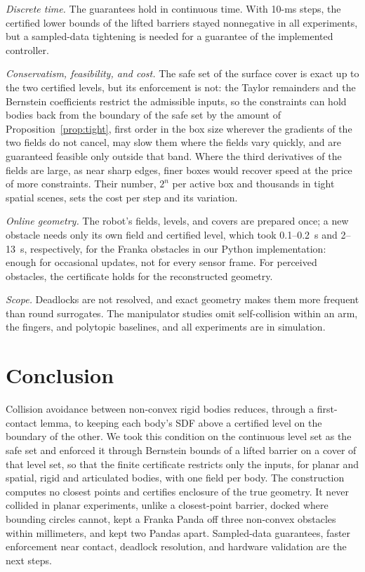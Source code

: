 \documentclass[journal]{IEEEtran}
\theoremstyle{definition}
\begin{document}
\emph{Discrete time.} The guarantees hold in continuous time. With 10-ms steps, the certified lower
bounds of the lifted barriers stayed nonnegative in all experiments, but a sampled-data tightening is
needed for a guarantee of the implemented controller.

\emph{Conservatism, feasibility, and cost.} The safe set of the surface cover is exact up to the two
certified levels, but its enforcement is not: the Taylor remainders and the Bernstein coefficients
restrict the admissible inputs, so the constraints can hold bodies back from the boundary of the safe
set by the amount of Proposition~\ref{prop:tight}, first order in the box size wherever the gradients of
the two fields do not cancel, may slow them where the fields vary quickly, and are
guaranteed feasible only outside that band. Where the third derivatives of the fields are large, as
near sharp edges, finer boxes would recover speed at the price of more constraints. Their number,
$2^n$ per active box and thousands in tight spatial scenes, sets the cost per step and its
variation.

\emph{Online geometry.} The robot's fields, levels, and covers are prepared once; a new obstacle needs
only its own field and certified level, which took 0.1--0.2~s and 2--13~s, respectively, for the
Franka obstacles in our Python implementation: enough for occasional updates, not for every sensor
frame. For perceived obstacles, the certificate holds for the reconstructed geometry.

\emph{Scope.} Deadlocks are not resolved, and exact geometry makes them more frequent than round
surrogates. The manipulator studies omit self-collision within an arm, the fingers, and polytopic
baselines, and all experiments are in simulation.

\section{Conclusion}\label{sec:concl}
Collision avoidance between non-convex rigid bodies reduces, through a first-contact lemma, to
keeping each body's SDF above a certified level on the boundary of the other. We took this condition
on the continuous level set as the safe set and enforced it through Bernstein bounds of a lifted
barrier on a cover of that level set, so that the finite certificate restricts only the inputs, for
planar and spatial, rigid and articulated bodies, with one field per body. The construction computes
no closest points and certifies enclosure of the true geometry. It never collided in planar
experiments, unlike a closest-point barrier, docked where bounding circles cannot, kept a Franka
Panda off three non-convex obstacles within millimeters, and kept two Pandas apart. Sampled-data
guarantees, faster enforcement near contact, deadlock resolution, and hardware validation are the
next steps.



\end{document}
